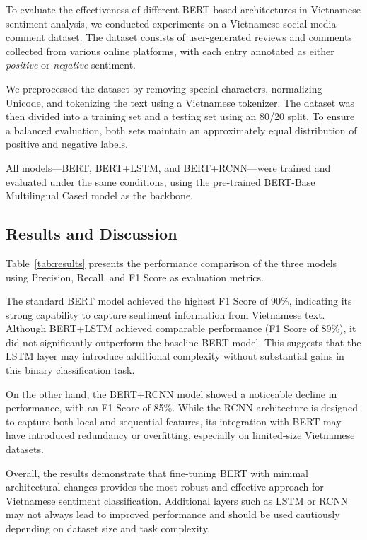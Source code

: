 \documentclass[11pt]{article}
\begin{document}
To evaluate the effectiveness of different BERT-based architectures in Vietnamese sentiment analysis, we conducted experiments on a Vietnamese social media comment dataset. The dataset consists of user-generated reviews and comments collected from various online platforms, with each entry annotated as either \textit{positive} or \textit{negative} sentiment.

We preprocessed the dataset by removing special characters, normalizing Unicode, and tokenizing the text using a Vietnamese tokenizer. The dataset was then divided into a training set and a testing set using an 80/20 split. To ensure a balanced evaluation, both sets maintain an approximately equal distribution of positive and negative labels.

All models—BERT, BERT+LSTM, and BERT+RCNN—were trained and evaluated under the same conditions, using the pre-trained BERT-Base Multilingual Cased model as the backbone.

\subsection{Results and Discussion}

Table~\ref{tab:results} presents the performance comparison of the three models using Precision, Recall, and F1 Score as evaluation metrics.

The standard BERT model achieved the highest F1 Score of 90\%, indicating its strong capability to capture sentiment information from Vietnamese text. Although BERT+LSTM achieved comparable performance (F1 Score of 89\%), it did not significantly outperform the baseline BERT model. This suggests that the LSTM layer may introduce additional complexity without substantial gains in this binary classification task.

On the other hand, the BERT+RCNN model showed a noticeable decline in performance, with an F1 Score of 85\%. While the RCNN architecture is designed to capture both local and sequential features, its integration with BERT may have introduced redundancy or overfitting, especially on limited-size Vietnamese datasets.

Overall, the results demonstrate that fine-tuning BERT with minimal architectural changes provides the most robust and effective approach for Vietnamese sentiment classification. Additional layers such as LSTM or RCNN may not always lead to improved performance and should be used cautiously depending on dataset size and task complexity.
\end{document}
